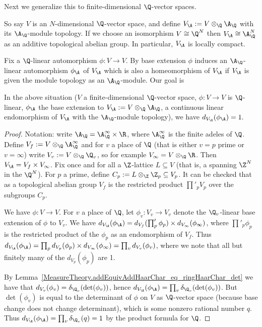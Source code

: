   Next we generalize this to finite-dimensional $\Q$-vector spaces.

  So say $V$ is an $N$-dimensional $\Q$-vector space,
  and define $V_{\A}:= V\otimes_{\Q}\A_{\Q}$ with its $\A_{\Q}$-module topology.
  If we choose an isomorphism $V\cong\Q^N$ then $V_{\A}\cong\A_{\Q}^N$
  as an additive topological abelian group. In particular, $V_{\A}$ is locally compact.

  Fix a $\Q$-linear automorphism $\phi:V\to V$. By base extension $\phi$ induces
  an $\A_{\Q}$-linear automorphism $\phi_{\A}$ of $V_{\A}$ which is also a homeomorphism of $V_{\A}$
  if $V_{\A}$ is given the module topology as an $\A_{\Q}$-module. Our goal is

  \begin{theorem}
    \label{addHaarScalarFactor_eq_one}
    In the above situation ($V$ a finite-dimensional $\Q$-vector space, $\phi:V\to V$ is $\Q$-linear,
    $\phi_{\A}$ the base extension to $V_{\A}:=V\otimes_{\Q}{\A_{\Q}}$, a continuous linear
    endomorphism of $V_{\A}$ with the $\A_{\Q}$-module topology), we have $d_{V_{\A}}(\phi_{\A})=1.$
  \end{theorem}
  \begin{proof}
    Notation: write $\A_{\Q}=\A_{\Q}^\infty\times\R$, where $\A_{\Q}^\infty$ is the finite adeles of $\Q$.
    Define $V_f:= V\otimes_{\Q}\A_{\Q}^\infty$ and for $v$ a place of $\Q$ (that is either $v=p$ prime
    or $v=\infty$) write $V_v:=V\otimes_{\Q}\Q_v$, so for example $V_\infty=V\otimes_{\Q}\R$.
    Then $V_{\A}=V_f\times V_\infty$. Fix once and for all a $\Z$-lattice $L\subseteq V$
    (that is, a spanning $\Z^N$ in the $\Q^N$).
    For $p$ a prime, define $C_p:=L\otimes_{\Z}\Z_p\subseteq V_p$. It can be checked that
    as a topological abelian group $V_f$ is the restricted product $\prod'_p V_p$ over the
    subgroups $C_p$.

    We have $\phi:V\to V$. For $v$ a place of $\Q$, let $\phi_v:V_v\to V_v$ denote the $\Q_v$-linear
    base extension of $\phi$ to $V_v$. We have $d_{V_{\A}}(\phi_{\A})=d_{V_f}(\prod'_p \phi_p)\times d_{V_\infty}(\phi_\infty)$,
    where $\prod'_p \phi_p$ is the restricted product of the $\phi_p$ as an endomorphism of $V_f$.
    Thus $d_{V_{\A}}(\phi_{\A})=\prod_p d_{V_p}(\phi_p)\times d_{V_\infty}(\phi_\infty)=\prod_v d_{V_v}(\phi_v)$, where
    we note that all but finitely many of the $d_{V_p}(\phi_p)$ are 1.

    By Lemma~\ref{MeasureTheory.addEquivAddHaarChar_eq_ringHaarChar_det} we have that
    $d_{V_v}(\phi_v)=\delta_{\Q_v}(\det(\phi_v))$, hence $d_{V_{\A}}(\phi_{\A})=\prod_v\delta_{\Q_v}(\det(\phi_v))$.
    But $\det(\phi_v)$ is equal to the determinant of $\phi$ on $V$ as $\Q$-vector space (because
    base change does not change determinant),
    which is some nonzero rational number $q$. Thus $d_{V_{\A}}(\phi_{\A})=\prod_v\delta_{\Q_v}(q)=1$
    by the product formula for $\Q$.
  \end{proof}

